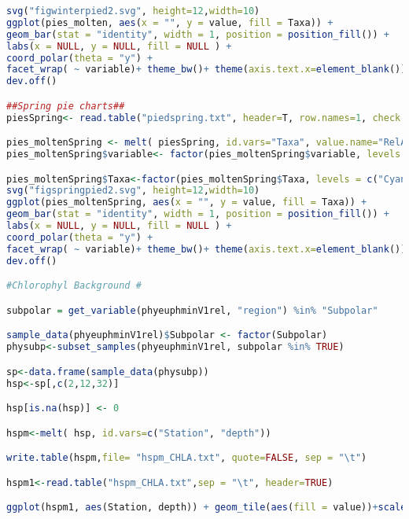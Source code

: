 \documentclass{article}
\begin{document}
\begin{lstlisting}[language=R,caption={N1N2figscripts}]
svg("figwinterpied2.svg", height=12,width=10)
ggplot(pies_molten, aes(x = "", y = value, fill = Taxa)) + 
geom_bar(stat = "identity", width = 1, position = position_fill()) +
labs(x = NULL, y = NULL, fill = NULL ) +
coord_polar(theta = "y") + 
facet_wrap( ~ variable)+ theme_bw()+ theme(axis.text.x=element_blank())+ scale_fill_manual(values = coloresbarplot)
dev.off()

##Spring pie charts##
piesSpring<- read.table("piedspring.txt", header=T, row.names=1, check.names=F)

pies_moltenSpring <- melt( piesSpring, id.vars="Taxa", value.name="RelAb", variable.name="Sample" )
pies_moltenSpring$variable<- factor(pies_moltenSpring$variable, levels = c("NAAMES2-1_S21", "NAAMES2-2_S22", "NAAMES2-4_S37", "NAAMES2-5_S23", "NAAMES2-9_S24","NAAMES2-10_S39", "NAAMES2-11_S40", "NAAMES2-13_S41", "NAAMES2-14_S42", "NAAMES2-17_S25" ,"NAAMES2-18_S26", "NAAMES2-19_S44", "NAAMES2-21_S27"))

pies_moltenSpring$Taxa<-factor(pies_moltenSpring$Taxa, levels = c("Cyanobacteria", "ASV357", "Prasinophyta", "Cryptophyceae", "Rappemonad", "Prymnesiophyceae", "Stramenopiles:Chrysophyceae", "Stramenopiles:Pelagophyceae", "Stramenopiles:Dictyochophyceae", "Stramenopiles:Bolidophyceae", "Stramenopiles:Diatoms", "others"))
svg("figspringpied2.svg", height=12,width=10)
ggplot(pies_moltenSpring, aes(x = "", y = value, fill = Taxa)) + 
geom_bar(stat = "identity", width = 1, position = position_fill()) +
labs(x = NULL, y = NULL, fill = NULL ) +
coord_polar(theta = "y") + 
facet_wrap( ~ variable)+ theme_bw()+ theme(axis.text.x=element_blank())+ scale_fill_manual(values = coloresbarplot)
dev.off()

#Chlorophyl Background #

subpolar = get_variable(phyeuphminV1rel, "region") %in% "Subpolar"

sample_data(phyeuphminV1rel)$Subpolar <- factor(Subpolar)
physubp<-subset_samples(phyeuphminV1rel, subpolar %in% TRUE)

sp<-data.frame(sample_data(physubp))
hsp<-sp[,c(2,12,32)]

hsp[is.na(hsp)] <- 0

hspm<-melt( hsp, id.vars=c("Station", "depth"))

write.table(hspm,file= "hspm_CHLA.txt", quote=FALSE, sep = "\t")

hspm1<-read.table("hspm_CHLA.txt",sep = "\t", header=TRUE)

ggplot(hspm1, aes(Station, depth)) + geom_tile(aes(fill = value))+scale_fill_gradient(low = "white",high = "forestgreen", breaks=c(0,0.5,1,1.5,2,2.5,3,3.5,4,4.5,5), limits=c(0,5))


\end{lstlisting}
\end{document}
